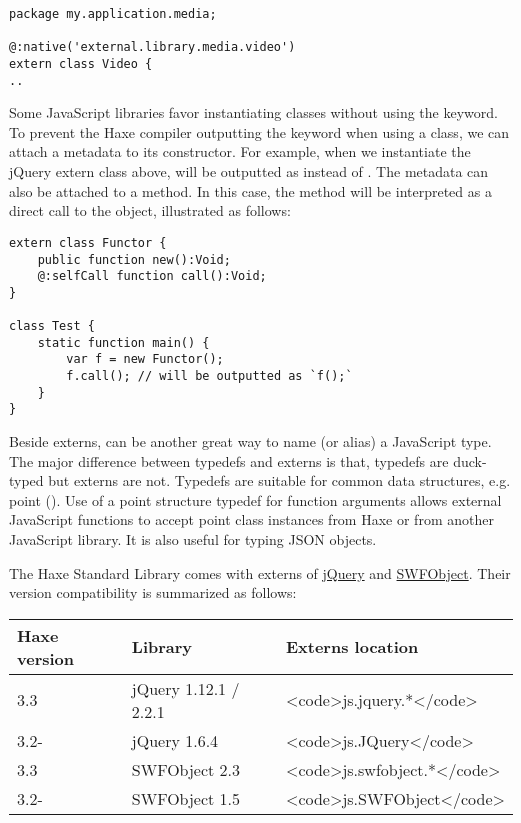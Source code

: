 \begin{lstlisting}
package my.application.media;

@:native('external.library.media.video')
extern class Video {
..
\end{lstlisting}

Some JavaScript libraries favor instantiating classes without using the  keyword. To prevent the Haxe compiler outputting the  keyword when using a class, we can attach a  metadata to its constructor. For example, when we instantiate the jQuery extern class above,  will be outputted as \expr{\$()} instead of . The  metadata can also be attached to a method. In this case, the method will be interpreted as a direct call to the object, illustrated as follows:

\begin{lstlisting}
extern class Functor {
	public function new():Void;
	@:selfCall function call():Void;
}

class Test {
	static function main() {
		var f = new Functor();
		f.call(); // will be outputted as `f();`
	}
}
\end{lstlisting}

Beside externs,  can be another great way to name (or alias) a JavaScript type. The major difference between typedefs and externs is that, typedefs are duck-typed but externs are not. Typedefs are suitable for common data structures, e.g. point (). Use of a point structure typedef for function arguments allows external JavaScript functions to accept point class instances from Haxe or from another JavaScript library. It is also useful for typing JSON objects.

The Haxe Standard Library comes with externs of \href{https://jquery.com/}{jQuery} and \href{http://blog.deconcept.com/swfobject/}{SWFObject}. Their version compatibility is summarized as follows:

\begin{center}
\begin{tabular}{| l | l | l |}
	\hline
	Haxe version & Library               & Externs location \\ \hline
	3.3          & jQuery 1.12.1 / 2.2.1 & <code>js.jquery.*</code> \\
	3.2-         & jQuery 1.6.4          & <code>js.JQuery</code> \\
	3.3          & SWFObject 2.3         & <code>js.swfobject.*</code> \\
	3.2-         & SWFObject 1.5         & <code>js.SWFObject</code> \\ \hline
\end{tabular}
\end{center}

